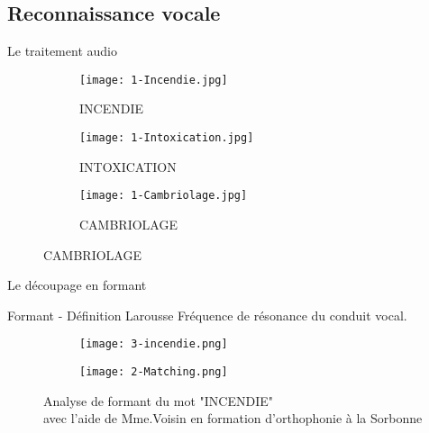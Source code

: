 \subsection{Reconnaissance vocale}

\begin{frame}{Le traitement audio}
	\begin{figure}
		\begin{subfigure}[]{0.32\textwidth}
			\texttt{[image: 1-Incendie.jpg]}
			\caption{INCENDIE}
		\end{subfigure}
		\begin{subfigure}[]{0.32\textwidth}
			\texttt{[image: 1-Intoxication.jpg]}
			\caption{INTOXICATION}
		\end{subfigure}
		\begin{subfigure}[]{0.32\textwidth}
			\texttt{[image: 1-Cambriolage.jpg]}
			\caption{CAMBRIOLAGE}
		\end{subfigure}
	\end{figure}
\end{frame}



\begin{frame}{Le découpage en formant}
	\begin{block}{Formant - Définition Larousse}
		Fréquence de résonance du conduit vocal. \\
	\end{block}
	\begin{figure}
		\centering
		\begin{subfigure}[]{0.55\textwidth}
			\texttt{[image: 3-incendie.png]}
		\end{subfigure}
		\begin{subfigure}[]{0.44\textwidth}
			\texttt{[image: 2-Matching.png]}
		\end{subfigure}
		\caption{Analyse de formant du mot "INCENDIE" \\avec l'aide de Mme.Voisin en formation d'orthophonie à la Sorbonne}
	\end{figure}
\end{frame}
